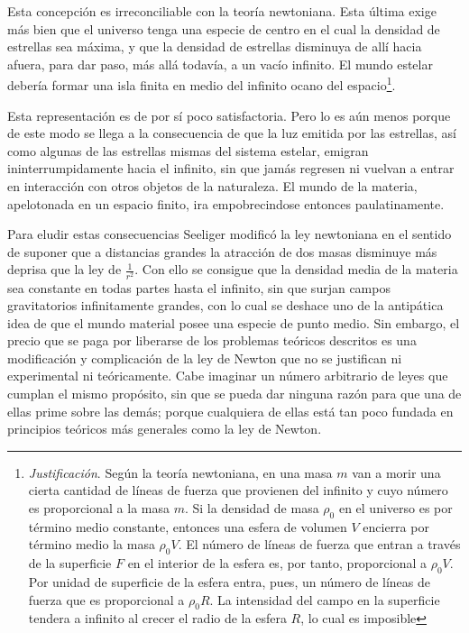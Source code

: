 \documentclass[spanish]{book}
\begin{document}
Esta concepción es irreconciliable con la teoría newtoniana. Esta última exige más
bien que el universo tenga una especie de centro en el cual la densidad de estrellas sea
máxima, y que la densidad de estrellas disminuya de allí hacia afuera, para dar paso, más
allá todavía, a un vacío infinito. El mundo estelar debería formar una isla finita en
medio del infinito ocano del espacio\footnote{\textit{Justificación}. Según la teoría 
newtoniana, en una masa $m$ van a morir una cierta cantidad de líneas de fuerza que 
provienen del infinito y cuyo número es proporcional a la masa $m$. Si la densidad 
de masa $\rho_{0}$ en el universo es por término medio constante, entonces una esfera 
de volumen $V$ encierra por término medio la masa $\rho_{0}V$. El número de líneas de
fuerza que entran a través de la superficie $F$ en el interior de la esfera es, por 
tanto, proporcional a $\rho_{0}V$. Por unidad de superficie de la esfera entra, pues, 
un número de líneas de fuerza que es proporcional a $\rho_{0}R$. La intensidad del campo
en la superficie tendera a infinito al crecer el radio de la esfera $R$, lo cual es imposible}.

Esta representación es de por sí poco satisfactoria. Pero lo es aún menos porque de
este modo se llega a la consecuencia de que la luz emitida por las estrellas, así como
algunas de las estrellas mismas del sistema estelar, emigran ininterrumpidamente hacia
el infinito, sin que jamás regresen ni vuelvan a entrar en interacción con otros objetos
de la naturaleza. El mundo de la materia, apelotonada en un espacio finito, ira
empobrecindose entonces paulatinamente.

Para eludir estas consecuencias Seeliger modificó la ley newtoniana en el sentido
de suponer que a distancias grandes la atracción de dos masas disminuye más deprisa
que la ley de $\frac{1}{r^{2}}$. Con ello se consigue que la densidad media de la materia sea constante en todas
partes hasta el infinito, sin que surjan campos gravitatorios infinitamente grandes, con lo
cual se deshace uno de la antipática idea de que el mundo material posee una especie
de punto medio. Sin embargo, el precio que se paga por liberarse de los problemas
teóricos descritos es una modificación y complicación de la ley de Newton que no se
justifican ni experimental ni teóricamente. Cabe imaginar un número arbitrario de leyes
que cumplan el mismo propósito, sin que se pueda dar ninguna razón para que una de
ellas prime sobre las demás; porque cualquiera de ellas está tan poco fundada en
principios teóricos más generales como la ley de Newton.
\end{document}
